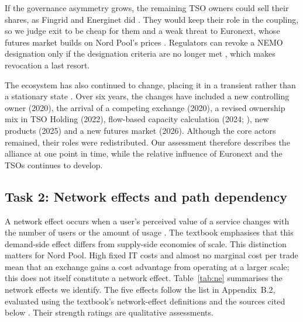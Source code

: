 If the governance asymmetry grows, the remaining TSO owners could sell their shares, as Fingrid and Energinet did \citep{EPSOG2022Completed}. They would keep their role in the coupling, so we judge exit to be cheap for them and a weak threat to Euronext, whose futures market builds on Nord Pool's prices \citep{Euronext2026}. Regulators can revoke a NEMO designation only if the designation criteria are no longer met \citep[Article~4(8)]{CACM2015}, which makes revocation a last resort.

The ecosystem has also continued to change, placing it in a transient rather than a stationary state \citep[Section~4.2]{OverbyAudestad2021}. Over six years, the changes have included a new controlling owner (2020), the arrival of a competing exchange (2020), a revised ownership mix in TSO Holding (2022), flow-based capacity calculation (2024; \citealp{NPFlowBased2024}), new products (2025) and a new futures market (2026). Although the core actors remained, their roles were redistributed. Our assessment therefore describes the alliance at one point in time, while the relative influence of Euronext and the TSOs continues to develop.

\subsection{Task 2: Network effects and path dependency}
\label{sec:t2}

A network effect occurs when a user's perceived value of a service changes with the number of users or the amount of usage \citep[Def.~9.1]{OverbyAudestad2021}. The textbook emphasises that this demand-side effect differs from supply-side economies of scale. This distinction matters for Nord Pool. High fixed IT costs and almost no marginal cost per trade mean that an exchange gains a cost advantage from operating at a larger scale; this does not itself constitute a network effect. Table~\ref{tab:ne} summarises the network effects we identify. The five effects follow the list in Appendix~B.2, evaluated using the textbook's network-effect definitions and the sources cited below \citep[Sections~9.2--9.5]{OverbyAudestad2021}. Their strength ratings are qualitative assessments.

